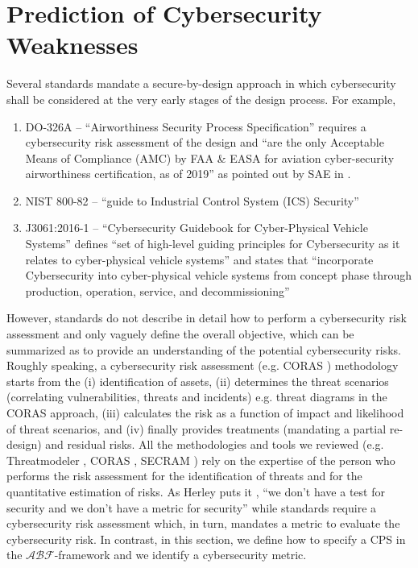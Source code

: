 \documentclass[conference]{IEEEtran}
\newcommand{\assertionRegion}{\mathcal{A}}
\newcommand{\beliefRegion}{\mathcal{B}}
\newcommand{\factRegion}{\mathcal{F}}
\newcommand{\abftheory}{\assertionRegion\beliefRegion\factRegion}
\begin{document}
\section{Prediction of Cybersecurity Weaknesses}\label{sec:theory}
Several standards mandate a secure-by-design approach in which cybersecurity
shall be considered at the very early stages of the design process.  For
example,
\begin{enumerate}[noitemsep]
	\item DO-326A -- ``Airworthiness Security Process Specification''
		requires a cybersecurity risk assessment of the design and
		``are the only Acceptable Means of Compliance (AMC) by FAA
		\& EASA for aviation cyber-security airworthiness certification,
		as of 2019'' as pointed out by SAE in \autocite{SAE2019DO326A}.
	\item NIST 800-82 \autocite{Stouffer2011guide} -- ``guide to Industrial
		Control System (ICS) Security''
	\item J3061:2016-1 \autocite{SAE2016J3061} -- ``Cybersecurity Guidebook
		for Cyber-Physical Vehicle Systems'' defines ``set of
		high-level guiding principles for Cybersecurity as it relates
		to cyber-physical vehicle systems'' and states that
		``incorporate Cybersecurity into cyber-physical vehicle systems
		from concept phase through production, operation, service, and
		decommissioning''
\end{enumerate}
However, standards do not describe in detail how to perform a cybersecurity risk 
assessment and only vaguely define the overall objective, which
can be summarized as to provide an understanding of the potential cybersecurity risks.
Roughly speaking, a cybersecurity risk assessment (e.g. CORAS \autocite{Lund2010model}) 
methodology starts from the (i) identification of assets, (ii) determines
the threat scenarios (correlating vulnerabilities, threats and incidents) e.g. 
threat diagrams in the CORAS
approach, (iii) calculates the risk as a function
of impact and likelihood of threat scenarios, and (iv) finally provides
treatments (mandating a partial re-design) and residual risks.
All the methodologies and tools we reviewed (e.g. Threatmodeler \autocite{Threatmodeler},
CORAS \autocite{Lund2010model}, SECRAM \autocite{De2015role})
rely on the expertise of the person who performs the risk assessment for
the identification of threats and for the quantitative estimation of risks.
As Herley puts it \autocite{Herley2016usenixvideo}, ``we don't have a test for security and
we don't have a metric for security'' while standards require a cybersecurity risk assessment
which, in turn, mandates a metric to evaluate the cybersecurity risk. 
In contrast, in this section, we define how to specify a CPS in the $\abftheory$-framework
and we identify a cybersecurity metric.
\end{document}
